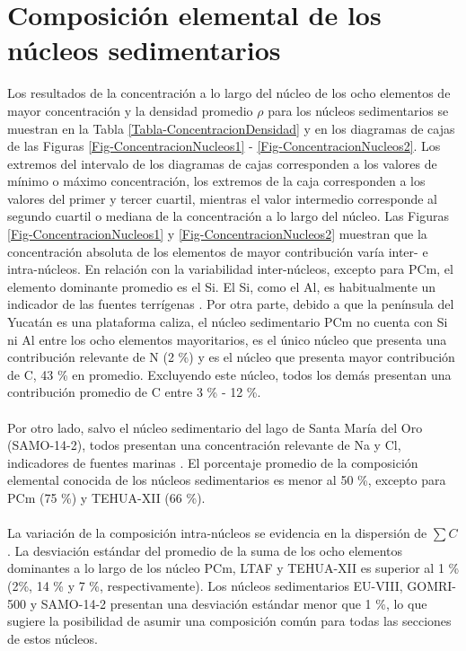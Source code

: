 	\section{Composición elemental de los núcleos sedimentarios}\label{Secc-ResultadosComposici}
Los resultados de la concentración a lo largo del núcleo de los ocho elementos de mayor concentración y la densidad promedio $\rho$ para los núcleos sedimentarios se muestran en la Tabla \ref{Tabla-ConcentracionDensidad} y en los diagramas de cajas de las Figuras \ref{Fig-ConcentracionNucleos1} - \ref{Fig-ConcentracionNucleos2}. Los extremos del intervalo de los diagramas de cajas corresponden a los valores de mínimo o máximo concentración, los extremos de la caja corresponden a los valores del primer y tercer cuartil, mientras el valor intermedio corresponde al segundo cuartil o mediana de la concentración a lo largo del núcleo.
\newpage
Las Figuras \ref{Fig-ConcentracionNucleos1} y \ref{Fig-ConcentracionNucleos2} muestran que la concentración absoluta de los elementos  de mayor contribución varía inter- e intra-núcleos. En relación con la variabilidad inter-núcleos, excepto para PCm, el elemento dominante promedio es el Si. El Si, como el Al, es habitualmente un indicador de las fuentes terrígenas \cite{Zabel2004}. Por otra parte, debido a que la península del Yucatán es una plataforma caliza, el núcleo sedimentario PCm no cuenta con Si ni Al entre los ocho elementos mayoritarios, es el único núcleo que presenta una contribución relevante de N (2 \%) y es el núcleo que presenta mayor contribución de C, 43 \% en promedio. Excluyendo este núcleo, todos los demás presentan una contribución promedio de C entre 3 \% - 12 \%. 
\\
\\
Por otro lado, salvo el núcleo sedimentario del lago de Santa María del Oro (SAMO-14-2), todos presentan una concentración relevante de Na y Cl, indicadores de fuentes marinas \cite{ruiz2016accretion}. El porcentaje promedio de la composición elemental conocida de los núcleos sedimentarios es menor al 50 \%, excepto para PCm (75 \%) y TEHUA-XII (66 \%). 
\\
\\
La variación de la composición intra-núcleos se evidencia en la dispersión de $\sum C$. La desviación estándar del promedio de la suma de los ocho elementos dominantes a lo largo de los núcleo PCm, LTAF y TEHUA-XII  es superior al 1 \%  (2\%, 14 \% y 7 \%, respectivamente). Los núcleos sedimentarios EU-VIII, GOMRI-500 y SAMO-14-2 presentan una desviación estándar menor que 1 \%, lo que sugiere la posibilidad de asumir una composición común para todas las secciones de estos núcleos.
